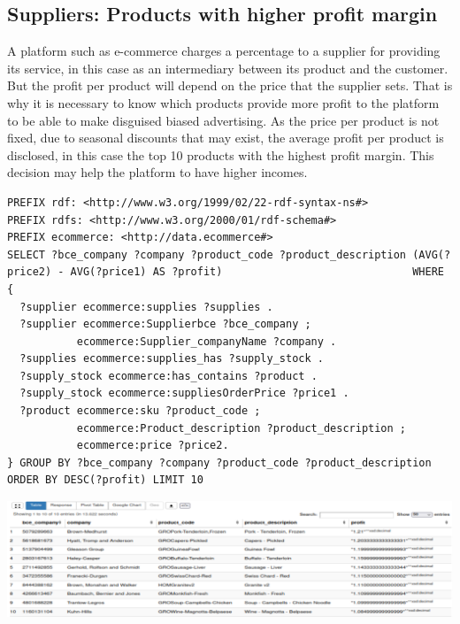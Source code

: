 \documentclass{article}
\begin{document}
\subsection{Suppliers: Products with higher profit margin}
A platform such as e-commerce charges a percentage to a supplier for providing its service, in this case as an intermediary between its product and the customer. But the profit per product will depend on the price that the supplier sets. That is why it is necessary to know which products provide more profit to the platform to be able to make disguised biased advertising. As the price per product is not fixed, due to seasonal discounts that may exist, the average profit per product is disclosed, in this case the top 10 products with the highest profit margin. This decision may help the platform to have higher incomes. \\

\begin{lstlisting}[breaklines, frame=single]
PREFIX rdf: <http://www.w3.org/1999/02/22-rdf-syntax-ns#>
PREFIX rdfs: <http://www.w3.org/2000/01/rdf-schema#>
PREFIX ecommerce: <http://data.ecommerce#>
SELECT ?bce_company ?company ?product_code ?product_description (AVG(?price2) - AVG(?price1) AS ?profit)                              WHERE {
  ?supplier ecommerce:supplies ?supplies .
  ?supplier ecommerce:Supplierbce ?bce_company ;
           ecommerce:Supplier_companyName ?company .
  ?supplies ecommerce:supplies_has ?supply_stock .
  ?supply_stock ecommerce:has_contains ?product .
  ?supply_stock ecommerce:suppliesOrderPrice ?price1 .
  ?product ecommerce:sku ?product_code ;
           ecommerce:Product_description ?product_description ;
           ecommerce:price ?price2.
} GROUP BY ?bce_company ?company ?product_code ?product_description ORDER BY DESC(?profit) LIMIT 10
\end{lstlisting}

\begin{center}
   \includegraphics[scale=0.25]{OISreport-supplier-query.png}
\end{center}
\end{document}
